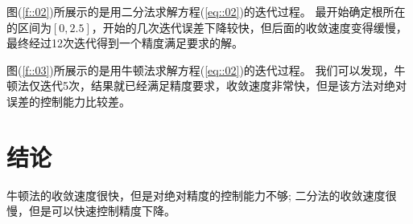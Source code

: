 \documentclass{ctexart}
\begin{document}
图(\ref{f::02})所展示的是用二分法求解方程(\ref{eq::02})的迭代过程。
最开始确定根所在的区间为$[0,2.5]$，开始的几次迭代误差下降较快，但后面的收敛速度变得缓慢，最终经过12次迭代得到一个精度满足要求的解。\par

图(\ref{f::03})所展示的是用牛顿法求解方程(\ref{eq::02})的迭代过程。
我们可以发现，牛顿法仅迭代5次，结果就已经满足精度要求，收敛速度非常快，但是该方法对绝对误差的控制能力比较差。
\section{结论}
牛顿法的收敛速度很快，但是对绝对精度的控制能力不够;
二分法的收敛速度很慢，但是可以快速控制精度下降。

\newpage
\newcommand{\url}{}


\end{document}
